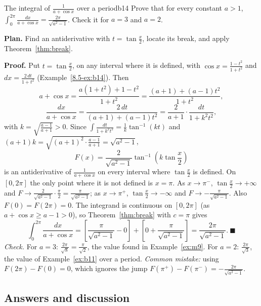 \documentclass[11pt]{article}
\begin{document}
\begin{exmp}{The integral of $\frac1{a+\cos x}$ over a period}{b14}
Prove that for every constant $a>1$, $\displaystyle\int_0^{2\pi}\frac{dx}{a+\cos x}=\frac{2\pi}{\sqrt{a^2-1}}$. Check it for $a=3$ and $a=2$.

\textbf{Plan.} Find an antiderivative with $t=\tan\frac x2$, locate its break, and apply Theorem~\ref{thm:break}.

\textbf{Proof.} Put $t=\tan\frac x2$, on any interval where it is defined, with $\cos x=\frac{1-t^2}{1+t^2}$ and $dx=\frac{2\,dt}{1+t^2}$ (Example~\ref{8.5-ex:b14}). Then
\[a+\cos x=\frac{a(1+t^2)+1-t^2}{1+t^2}=\frac{(a+1)+(a-1)t^2}{1+t^2},\]
\[\frac{dx}{a+\cos x}=\frac{2\,dt}{(a+1)+(a-1)t^2}=\frac2{a+1}\cdot\frac{dt}{1+k^2t^2},\]
with $k=\sqrt{\frac{a-1}{a+1}}>0$. Since $\int\frac{dt}{1+k^2t^2}=\frac1k\tan^{-1}(kt)$ and $(a+1)k=\sqrt{(a+1)^2\cdot\frac{a-1}{a+1}}=\sqrt{a^2-1}$,
\[F(x)=\frac2{\sqrt{a^2-1}}\tan^{-1}\left(k\tan\frac x2\right)\]
is an antiderivative of $\frac1{a+\cos x}$ on every interval where $\tan\frac x2$ is defined. On $[0,2\pi]$ the only point where it is not defined is $x=\pi$. As $x\to\pi^-$, $\tan\frac x2\to+\infty$ and $F\to\frac2{\sqrt{a^2-1}}\cdot\frac\pi2=\frac\pi{\sqrt{a^2-1}}$; as $x\to\pi^+$, $\tan\frac x2\to-\infty$ and $F\to-\frac\pi{\sqrt{a^2-1}}$. Also $F(0)=F(2\pi)=0$. The integrand is continuous on $[0,2\pi]$ (as $a+\cos x\ge a-1>0$), so Theorem~\ref{thm:break} with $c=\pi$ gives
\[\int_0^{2\pi}\frac{dx}{a+\cos x}=\left[\frac\pi{\sqrt{a^2-1}}-0\right]+\left[0+\frac\pi{\sqrt{a^2-1}}\right]=\frac{2\pi}{\sqrt{a^2-1}}.\ \blacksquare\]
\emph{Check.} For $a=3$: $\frac{2\pi}{\sqrt8}=\frac\pi{\sqrt2}$, the value found in Example~\ref{ex:m9}. For $a=2$: $\frac{2\pi}{\sqrt3}$, the value of Example~\ref{ex:b11} over a period. \emph{Common mistake:} using $F(2\pi)-F(0)=0$, which ignores the jump $F(\pi^+)-F(\pi^-)=-\frac{2\pi}{\sqrt{a^2-1}}$.
\end{exmp}

\subsection*{Answers and discussion}
\end{document}
